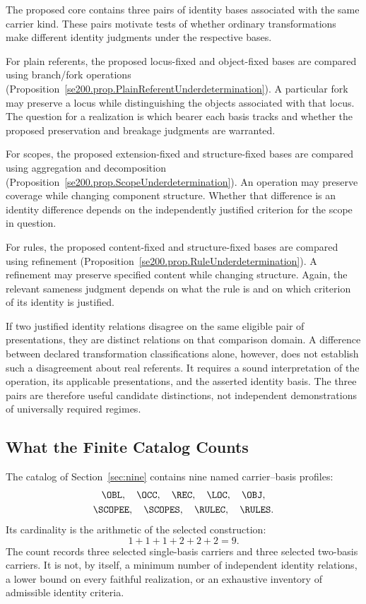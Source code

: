 The proposed core contains three pairs of identity bases associated
with the same carrier kind.
These pairs motivate tests of whether ordinary transformations make
different identity judgments under the respective bases.

For plain referents, the proposed locus-fixed and object-fixed bases
are compared using branch/fork operations
(Proposition~\ref{se200.prop.PlainReferentUnderdetermination}).
A particular fork may preserve a locus while distinguishing the objects
associated with that locus.
The question for a realization is which bearer each basis tracks and
whether the proposed preservation and breakage judgments are warranted.

For scopes, the proposed extension-fixed and structure-fixed bases
are compared using aggregation and decomposition
(Proposition~\ref{se200.prop.ScopeUnderdetermination}).
An operation may preserve coverage while changing component structure.
Whether that difference is an identity difference depends on the
independently justified criterion for the scope in question.

For rules, the proposed content-fixed and structure-fixed bases
are compared using refinement
(Proposition~\ref{se200.prop.RuleUnderdetermination}).
A refinement may preserve specified content while changing structure.
Again, the relevant sameness judgment depends on what the rule is
and on which criterion of its identity is justified.

If two justified identity relations disagree on the same eligible pair
of presentations, they are distinct relations on that comparison domain.
A difference between declared transformation classifications alone,
however, does not establish such a disagreement about real referents.
It requires a sound interpretation of the operation, its applicable
presentations, and the asserted identity basis.
The three pairs are therefore useful candidate distinctions, not
independent demonstrations of universally required regimes.

\subsection{What the Finite Catalog Counts}
\label{subsec:the_bound}

The catalog of Section~\ref{sec:nine} contains nine named
carrier--basis profiles:
\[
\begin{gathered}
\OBL,\quad \OCC,\quad \REC,\quad \LOC,\quad \OBJ,\\
\SCOPEE,\quad \SCOPES,\quad \RULEC,\quad \RULES .
\end{gathered}
\]
Its cardinality is the arithmetic of the selected construction:
\[
1 + 1 + 1 + 2 + 2 + 2 = 9.
\]
The count records three selected single-basis carriers and three
selected two-basis carriers.
It is not, by itself, a minimum number of independent identity
relations, a lower bound on every faithful realization, or an
exhaustive inventory of admissible identity criteria.

